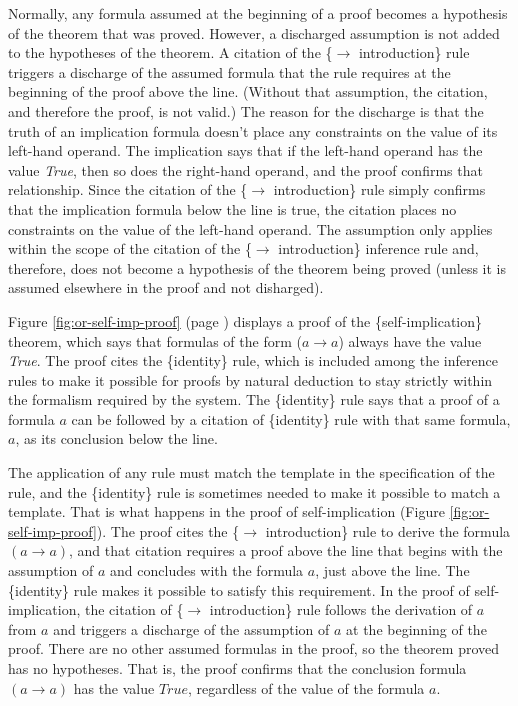 {Normally, any formula assumed at the beginning of a proof
becomes a hypothesis of the theorem that was proved.
However, a discharged assumption
is not added to the hypotheses of the theorem.
A citation of the \{$\rightarrow$ introduction\} rule
triggers a discharge of the assumed formula that the
rule requires at the beginning of the proof above the line.
(Without that assumption, the citation,
and therefore the proof, is not valid.)
The reason for the discharge is that the truth of an implication
formula doesn't place any constraints on the value of its
left-hand operand.
The implication says that if the left-hand operand
has the value \emph{True}, then so does the right-hand operand,
and the proof confirms that relationship.
Since the citation of the
\{$\rightarrow$ introduction\} rule
simply confirms that the implication formula below the line
is true, the citation places no constraints on the value
of the left-hand operand.
The assumption only applies within the scope
of the citation of the \{$\rightarrow$ introduction\} inference rule
and, therefore, does not become a hypothesis of the theorem being proved
(unless it is assumed elsewhere in the proof and not disharged).

Figure \ref{fig:or-self-imp-proof} (page \pageref{fig:or-self-imp-proof})
displays a proof of the \{self-implication\} theorem,
which says that formulas of the form ($a \rightarrow a$) always have the value \emph{True}.
The proof cites the \{identity\} rule,
which is included among the inference rules to make it
possible for proofs by natural deduction to stay strictly
within the formalism required by the system.
The \{identity\} rule says that a proof of a formula $a$
can be followed by a citation of \{identity\} rule
with that same formula, $a$, as its conclusion below the line.

The application of any rule must match the template in the specification of the rule,
and the \{identity\} rule is sometimes needed to make it possible to match a template.
That is what happens in the proof of self-implication (Figure \ref{fig:or-self-imp-proof}).
The proof cites the \{$\rightarrow$ introduction\} rule
to derive the formula $(a \rightarrow a)$,
and that citation requires
a proof above the line that begins with the assumption of $a$
and concludes with the formula $a$, just above the line.
The \{identity\} rule makes it possible to satisfy this requirement.
In the proof of self-implication,
the citation of \{$\rightarrow$ introduction\} rule follows
the derivation of $a$ from $a$ and triggers a discharge
of the assumption of $a$ at the beginning of the proof.
There are no other assumed formulas in the proof,
so the theorem proved has no hypotheses.
That is, the proof confirms that the conclusion formula
$(a \rightarrow a)$ has the value $True$, regardless of
the value of the formula $a$.

}
